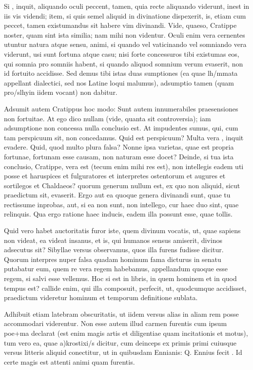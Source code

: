  Si , inquit, aliquando oculi peccent, tamen, quia recte aliquando viderunt, inest in iis vis videndi; item, si quis semel aliquid in divinatione dispexerit, is, etiam cum peccet, tamen existumandus sit habere vim divinandi. Vide, quaeso, Cratippe noster, quam sint ista similia; nam mihi non videntur. Oculi enim vera cernentes utuntur natura atque sensu, animi, si quando vel vaticinando vel somniando vera viderunt, usi sunt fortuna atque casu; nisi forte concessuros tibi existumas eos, qui somnia pro somniis habent, si quando aliquod somnium verum evaserit, non id fortuito accidisse. Sed demus tibi istas duas sumptiones (ea quae lh/mmata appellant dialectici, sed nos Latine loqui malumus), adsumptio tamen (quam pro/slhyin iidem vocant) non dabitur.

 Adsumit autem Cratippus hoc modo: Sunt autem innumerabiles praesensiones non fortuitae. At ego dico nullam (vide, quanta sit controversia); iam adsumptione non concessa nulla conclusio est. At impudentes sumus, qui, cum tam perspicuum sit, non concedamus. Quid est perspicuum? Multa vera , inquit evadere. Quid, quod multo plura falsa? Nonne ipsa varietas, quae est propria fortunae, fortunam esse causam, non naturam esse docet? Deinde, si tua ista conclusio, Cratippe, vera est (tecum enim mihi res est), non intellegis eadem uti posse et haruspices et fulguratores et interpretes ostentorum et augures et sortilegos et Chaldaeos? quorum generum nullum est, ex quo non aliquid, sicut praedictum sit, evaserit. Ergo aut ea quoque genera divinandi sunt, quae tu rectissume inprobas, aut, si ea non sunt, non intellego, cur haec duo sint, quae relinquis. Qua ergo ratione haec inducis, eadem illa possunt esse, quae tollis.

 Quid vero habet auctoritatis furor iste, quem divinum vocatis, ut, quae sapiens non videat, ea videat insanus, et is, qui humanos sensus amiserit, divinos adsecutus sit? Sibyllae versus observamus, quos illa furens fudisse dicitur. Quorum interpres nuper falsa quadam hominum fama dicturus in senatu putabatur eum, quem re vera regem habebamus, appellandum quoque esse regem, si salvi esse vellemus. Hoc si est in libris, in quem hominem et in quod tempus est? callide enim, qui illa composuit, perfecit, ut, quodcumque accidisset, praedictum videretur hominum et temporum definitione sublata.

 Adhibuit etiam latebram obscuritatis, ut iidem versus alias in aliam rem posse accommodari viderentur. Non esse autem illud carmen furentis cum ipsum poe+ma declarat (est enim magis artis et diligentiae quam incitationis et motus), tum vero ea, quae a)krostixi/s dicitur, cum deinceps ex primis primi cuiusque versus litteris aliquid conectitur, ut in quibusdam Ennianis: Q. Ennius fecit . Id certe magis est attenti animi quam furentis.

